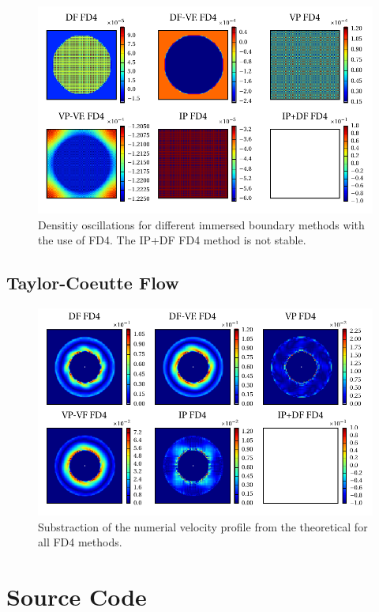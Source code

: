 \begin{figure}[!h]
  \centering
  \includegraphics{gfx/immersed_boundary/hpflow/long/rho.pdf}
  \caption{Densitiy oscillations for different immersed boundary methods with the use of FD4. The IP+DF FD4 method is not stable.}
    \label{fig:hpflow_allgc_theo}
\end{figure}

\section{Taylor-Coeutte  Flow}

\begin{figure}[!bp]
  \includegraphics{gfx/immersed_boundary/tcflow/long/vz_profiles_o4.pdf}
  \caption{\label{tcflow:results_vprofiles_o4}
    Substraction of the numerial velocity profile from the theoretical
        for all FD4 methods.}
\end{figure}

\chapter{Source Code}

